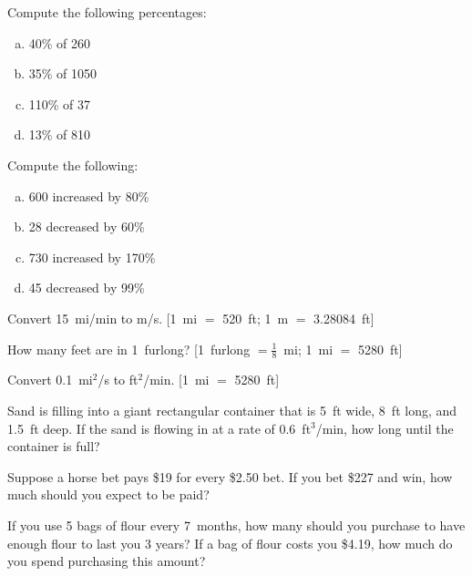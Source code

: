 \documentclass[11pt,letterpaper]{article}
\begin{document}
\newpage



 Compute the following percentages:
	\begin{enumerate}[(a)]
	\item 40\% of 260
	\item 35\% of 1050
	\item 110\% of 37
	\item 13\% of 810
	\end{enumerate}



\newpage



 Compute the following:
	\begin{enumerate}[(a)]
	\item 600 increased by 80\%
	\item 28 decreased by 60\%
	\item 730 increased by 170\%
	\item 45 decreased by 99\%
	\end{enumerate}



\newpage



 Convert 15~mi/min to m/s. [1~mi $=$ 520~ft; 1~m $=$ 3.28084~ft]



\newpage



 How many feet are in 1~furlong? [1~furlong $= \frac{1}{8}$~mi; 1~mi $=$ 5280~ft]



\newpage



 Convert 0.1~mi$^2$/s to ft$^2$/min. [1~mi $=$ 5280~ft]



\newpage



 Sand is filling into a giant rectangular container that is 5~ft wide, 8~ft long, and 1.5~ft deep. If the sand is flowing in at a rate of 0.6~ft$^3$/min, how long until the container is full? 



\newpage



 Suppose a horse bet pays \$19 for every \$2.50 bet. If you bet \$227 and win, how much should you expect to be paid?



\newpage



 If you use 5 bags of flour every 7~months, how many should you purchase to have enough flour to last you 3 years? If a bag of flour costs you \$4.19, how much do you spend purchasing this amount?
\end{document}
